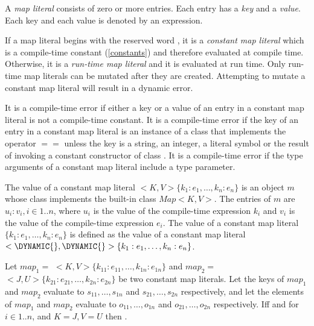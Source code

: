 \documentclass{article}
\begin{document}
\LMHash{}
A {\em map literal} consists of zero or more entries.
Each entry has a {\em key} and a {\em value}.
Each key and each value is denoted by an expression.

\LMHash{}
If a map literal begins with the reserved word \CONST{}, it is a {\em constant map literal} which is a compile-time constant (\ref{constants}) and therefore evaluated at compile time.
Otherwise, it is a {\em run-time map literal} and it is evaluated at run time.
Only run-time map literals can be mutated after they are created.
Attempting to mutate a constant map literal will result in a dynamic error.

\LMHash{}
It is a compile-time error if either a key or a value of an entry in a constant map literal is not a compile-time constant.
It is a compile-time error if the key of an entry in a constant map literal is an instance of a class that implements the operator $==$ unless the key is a
string, an integer, a literal symbol or the result of invoking a constant constructor of class .
It is a compile-time error if the type arguments of a constant map literal include a type parameter.

\LMHash{}
The value of a constant map literal \CONST{}$ <K, V>\{k_1:e_1, \ldots, k_n :e_n\}$ is an object $m$ whose class implements the built-in class $Map<K, V>$.
The entries of $m$ are $u_i:v_i, i \in 1 .. n$, where $u_i$ is the value of the compile-time expression $k_i$ and $v_i$ is the value of the compile-time expression $e_i$.
The value of a constant map literal \CONST{} $\{k_1:e_1, \ldots, k_n :e_n\}$ is defined as the value of a constant map literal \CONST{} $<\DYNAMIC{}, \DYNAMIC{}>\{k_1:e_1, \ldots, k_n:e_n\}$.

\LMHash{}
Let $map_1 =$ \CONST{}$ <K, V>\{k_{11}:e_{11}, \ldots, k_{1n} :e_{1n}\}$ and $map_2 =$ \CONST{}$ <J, U>\{k_{21}:e_{21}, \ldots, k_{2n} :e_{2n}\}$ be two constant map literals.
Let the keys of $map_1$ and $map_2$ evaluate to $s_{11}, \ldots, s_{1n}$ and $s_{21}, \ldots, s_{2n}$ respectively, and let the elements of $map_1$ and $map_2$ evaluate to $o_{11}, \ldots, o_{1n}$ and $o_{21}, \ldots, o_{2n}$ respectively.
If{}f  and  for $i \in 1 .. n$, and $K = J, V = U$ then .

\end{document}
